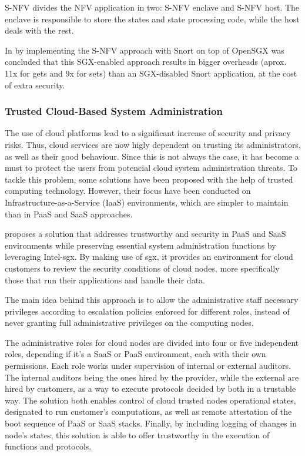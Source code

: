 S-NFV divides the NFV application in two: S-NFV enclave and S-NFV host. The enclave is responsible to store the states and state processing code, while the host deals with the rest.

In \cite{sNFVPaper} by implementing the S-NFV approach with Snort \cite{snortPaper} on top of OpenSGX was
concluded that this SGX-enabled approach results in bigger overheads (aprox. 11x for
gets and 9x for sets) than an SGX-disabled Snort application, at the cost of extra security.


\subsubsection{Trusted Cloud-Based System Administration}
The use of cloud platforms lead to a significant increase of security and privacy risks. Thus, cloud services are now higly dependent on trusting its administrators, as well as their good behaviour. Since this is not always the case, it has become a must to protect the users from potencial cloud system administration threats. 
To tackle this problem, some solutions have been proposed with the help of trusted computing technology. However, their focus have been conducted on Infrastructure-as-a-Service (IaaS) environments, which are simpler to maintain than in PaaS and SaaS approaches.

\cite{sgxCloudThesis} proposes a solution that addresses trustworthy and security in PaaS and SaaS environments while preserving essential system administration functions by leveraging Intel-\gls{sgx}. By making use of \gls{sgx}, it provides an environment for cloud customers to review the security conditions of cloud nodes, more specifically those that run their applications and handle their data.

The main idea behind this approach is to allow the administrative staff necessary privileges according to escalation policies enforced for different roles, instead of never granting full administrative privileges on the computing nodes.

The administrative roles for cloud nodes are divided into four or five independent roles, depending if it's a SaaS or PaaS environment, each with their own permissions. Each role works under supervision of internal or external auditors. The internal auditors being the ones hired by the provider, while the external are hired by customers, as a way to execute protocols decided by both in a trustable way. The solution both enables control of cloud trusted nodes operational states, designated to run customer's computations, as well as remote attestation of the boot sequence of PaaS or SaaS stacks. Finally, by including logging of changes in node's states, this solution is able to offer trustworthy in the execution of functions and protocols.

